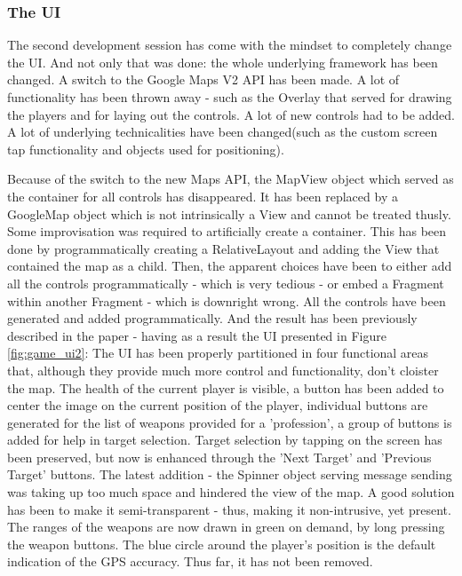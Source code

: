 \subsubsection{The UI}

The second development session has come with the mindset to completely change
the UI. And not only that was done: the whole underlying framework has been
changed. A switch to the Google Maps V2 API has been made. A lot of
functionality has been thrown away - such as the Overlay that served for drawing
the players and for laying out the controls. A lot of new controls had to be
added. A lot of underlying technicalities have been changed(such as the custom
screen tap functionality and objects used for positioning).\newline

Because of the switch to the new Maps API, the MapView object which served as
the container for all controls has disappeared. It has been replaced by a
GoogleMap object which is not intrinsically a View and cannot be treated thusly.
Some improvisation was required to artificially create a container. This has
been done by programmatically creating a RelativeLayout and adding the View that
contained the map as a child. Then, the apparent choices have been to either add
all the controls programmatically - which is very tedious - or embed a Fragment
within another Fragment - which is downright wrong. All the controls have been
generated and added programmatically. And the result has been previously
described in the paper - having as a result the UI presented in Figure
\ref{fig:game_ui2}: The UI has been properly partitioned in four functional
areas that, although they provide much more control and functionality, don't
cloister the map. The health of the current player is visible, a button has been
added to center the image on the current position of the player, individual
buttons are generated for the list of weapons provided for a 'profession', a
group of buttons is added for help in target selection. Target selection by
tapping on the screen has been preserved, but now is enhanced through the 'Next
Target' and 'Previous Target' buttons. The latest addition - the Spinner object
serving message sending was taking up too much space and hindered the view of
the map. A good solution has been to make it semi-transparent - thus, making it
non-intrusive, yet present. The ranges of the weapons are now drawn in green on
demand, by long pressing the weapon buttons. The blue circle around the player's
position is the default indication of the GPS accuracy. Thus far, it has not
been removed. \newline


